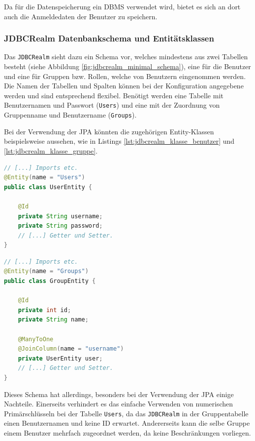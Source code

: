 Da für die Datenspeicherung ein \ac{DBMS} verwendet wird, bietet es sich an dort auch die Anmeldedaten der Benutzer zu speichern.

\subsubsection{JDBCRealm Datenbankschema und Entitätsklassen}
Das \texttt{JDBCRealm} sieht dazu ein Schema vor, welches mindestens aus zwei Tabellen besteht (siehe Abbildung \ref{fig:jdbcrealm_minimal_schema}), eine für die Benutzer und eine für Gruppen bzw. Rollen, welche von Benutzern eingenommen werden.
Die Namen der Tabellen und Spalten können bei der Konfiguration angegebene werden und sind entsprechend flexibel.
Benötigt werden eine Tabelle mit Benutzernamen und Passwort (\texttt{Users}) und eine mit der Zuordnung von Gruppenname und Benutzername (\texttt{Groups}).

Bei der Verwendung der \ac{JPA} könnten die zugehörigen Entity-Klassen beispielsweise aussehen, wie in Listings \ref{lst:jdbcrealm_klasse_benutzer} und \ref{lst:jdbcrealm_klasse_gruppe}.

\begin{minipage}[t]{0.5\textwidth}
\begin{lstlisting}[language=Java,caption={Beispiel für eine UserEntity Klasse.}, label=lst:jdbcrealm_klasse_benutzer]
// [...] Imports etc.
@Entity(name = "Users")
public class UserEntity {

    @Id
    private String username;
    private String password;
    // [...] Getter und Setter.
}
\end{lstlisting}
\end{minipage}
\begin{minipage}[t]{0.5\textwidth}
\begin{lstlisting}[language=Java,caption={Beispiel für eine GroupEntity Klasse.}, label=lst:jdbcrealm_klasse_gruppe]
// [...] Imports etc.
@Entity(name = "Groups")
public class GroupEntity {

    @Id
    private int id;
    private String name;

    @ManyToOne
    @JoinColumn(name = "username")
    private UserEntity user;
    // [...] Getter und Setter.
}
\end{lstlisting}
\end{minipage}

Dieses Schema hat allerdings, besonders bei der Verwendung der \ac{JPA} einige Nachteile.
Einerseits verhindert es das einfache Verwenden von numerischen Primärschlüsseln bei der Tabelle \texttt{Users}, da das \texttt{JDBCRealm} in der Gruppentabelle einen Benutzernamen und keine ID erwartet. 
Andererseits kann die selbe Gruppe einem Benutzer mehrfach zugeordnet werden, da keine Beschränkungen vorliegen.

